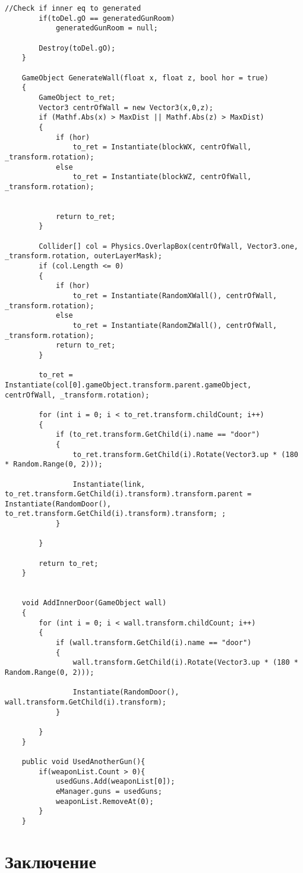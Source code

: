 \documentclass[14pt, titlepage,fleqn,a4paper]{extarticle}
\begin{document}
\begin{lstlisting}[caption= Генератор карты, label=lst:test]
        //Check if inner eq to generated 
        if(toDel.gO == generatedGunRoom)
            generatedGunRoom = null;

        Destroy(toDel.gO);
    }

    GameObject GenerateWall(float x, float z, bool hor = true)
    {
        GameObject to_ret;
        Vector3 centrOfWall = new Vector3(x,0,z);
        if (Mathf.Abs(x) > MaxDist || Mathf.Abs(z) > MaxDist)
        {
            if (hor)
                to_ret = Instantiate(blockWX, centrOfWall, _transform.rotation);
            else
                to_ret = Instantiate(blockWZ, centrOfWall, _transform.rotation);
            
            
            return to_ret;
        }

        Collider[] col = Physics.OverlapBox(centrOfWall, Vector3.one, _transform.rotation, outerLayerMask);
        if (col.Length <= 0)
        {
            if (hor)
                to_ret = Instantiate(RandomXWall(), centrOfWall, _transform.rotation);
            else
                to_ret = Instantiate(RandomZWall(), centrOfWall, _transform.rotation);
            return to_ret;
        }

        to_ret = Instantiate(col[0].gameObject.transform.parent.gameObject, centrOfWall, _transform.rotation);

        for (int i = 0; i < to_ret.transform.childCount; i++)
        {
            if (to_ret.transform.GetChild(i).name == "door")
            {
                to_ret.transform.GetChild(i).Rotate(Vector3.up * (180 * Random.Range(0, 2)));

                Instantiate(link, to_ret.transform.GetChild(i).transform).transform.parent = Instantiate(RandomDoor(), to_ret.transform.GetChild(i).transform).transform; ;
            }

        }

        return to_ret;
    }


    void AddInnerDoor(GameObject wall)
    {
        for (int i = 0; i < wall.transform.childCount; i++)
        {
            if (wall.transform.GetChild(i).name == "door")
            {
                wall.transform.GetChild(i).Rotate(Vector3.up * (180 * Random.Range(0, 2)));
                
                Instantiate(RandomDoor(), wall.transform.GetChild(i).transform);
            }

        }
    }

    public void UsedAnotherGun(){
        if(weaponList.Count > 0){
            usedGuns.Add(weaponList[0]);
            eManager.guns = usedGuns;
            weaponList.RemoveAt(0);
        }
    }
    \end{lstlisting}
    
	\section*{Заключение}
    
\end{document}
